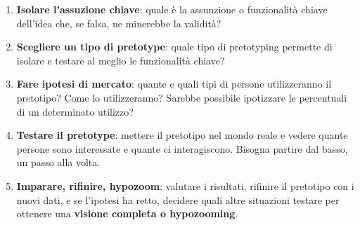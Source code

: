 \documentclass[a4paper,11pt,oneside]{book}
\begin{document}
\begin{enumerate}
	\item \textbf{Isolare l'assuzione chiave}: quale è la assunzione o funzionalità chiave dell'idea che, se falsa, ne minerebbe la validità?
	\item \textbf{Scegliere un tipo di pretotype}: quale tipo di pretotyping permette di isolare e testare al meglio le funzionalità chiave?
	\item \textbf{Fare ipotesi di mercato}: quante e quali tipi di persone utilizzeranno il pretotipo? Come lo utilizzeranno? Sarebbe possibile ipotizzare le percentuali di un determinato utilizzo?
	\item \textbf{Testare il pretotype}: mettere il pretotipo nel mondo reale e vedere quante persone sono interessate e quante ci interagiscono. Bisogna partire dal basso, un passo alla volta.
	\item \textbf{Imparare, rifinire, hypozoom}: valutare i risultati, rifinire il pretotipo con i nuovi dati, e se l'ipotesi ha retto, decidere quali altre situazioni testare per ottenere una \textbf{visione completa o hypozooming}.
\end{enumerate}

\pagebreak
\end{document}
